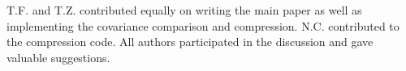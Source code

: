 	
	T.F. and T.Z. contributed equally on writing the main paper as well as implementing the covariance comparison and compression. N.C. contributed to the compression code. All authors participated in the discussion and gave valuable suggestions.